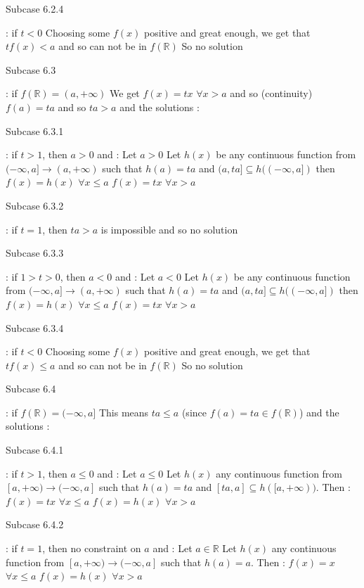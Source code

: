 \begin{solution}
\begin{bolded}Subcase 6.2.4\end{bolded} : if $t<0$
Choosing some $f(x)$ positive and great enough, we get that $tf(x)<a$ and so can not be in $f(\mathbb R)$
So no solution

\begin{bolded}Subcase 6.3\end{bolded} : if $f(\mathbb R)=(a,+\infty)$
We get $f(x)=tx$ $\forall x>a$ and so (continuity) $f(a)=ta$ and so $ta>a$ and the solutions :

\begin{bolded}Subcase 6.3.1\end{bolded} : if $t>1$, then $a>0$ and :
Let $a>0$
Let $h(x)$ be any continuous function from $(-\infty,a]\to(a,+\infty)$ such that $h(a)=ta$ and $(a,ta]\subseteq h((-\infty,a])$ then 
$f(x)=h(x)$ $\forall x\le a$
$f(x)=tx$ $\forall x>a$

\begin{bolded}Subcase 6.3.2\end{bolded} : if $t=1$, then $ta>a$ is impossible and so no solution

\begin{bolded}Subcase 6.3.3\end{bolded} : if $1>t>0$, then $a< 0$ and :
Let $a<0$
Let $h(x)$ be any continuous function from $(-\infty,a]\to(a,+\infty)$ such that $h(a)=ta$ and $(a,ta]\subseteq h((-\infty,a])$ then 
$f(x)=h(x)$ $\forall x\le a$
$f(x)=tx$ $\forall x>a$

\begin{bolded}Subcase 6.3.4\end{bolded} : if $t<0$
Choosing some $f(x)$ positive and great enough, we get that $tf(x)\le a$ and so can not be in $f(\mathbb R)$
So no solution

\begin{bolded}Subcase 6.4\end{bolded} : if $f(\mathbb R)=(-\infty,a]$
This means $ta\le a$ (since $f(a)=ta\in f(\mathbb R)$) and the solutions :

\begin{bolded}Subcase 6.4.1\end{bolded}: if $t>1$, then $a\le 0$ and :
Let $a\le 0$ 
Let $h(x)$ any continuous function from $[a,+\infty)\to(-\infty,a]$ such that $h(a)=ta$ and $[ta,a]\subseteq h([a,+\infty))$. Then :
$f(x)=tx$ $\forall x\le a$
$f(x)=h(x)$ $\forall x>a$

\begin{bolded}Subcase 6.4.2\end{bolded}: if $t=1$, then no constraint on $a$ and :
Let $a\in\mathbb R$ 
Let $h(x)$ any continuous function from $[a,+\infty)\to(-\infty,a]$ such that $h(a)=a$. Then :
$f(x)=x$ $\forall x\le a$
$f(x)=h(x)$ $\forall x>a$


\end{solution}
